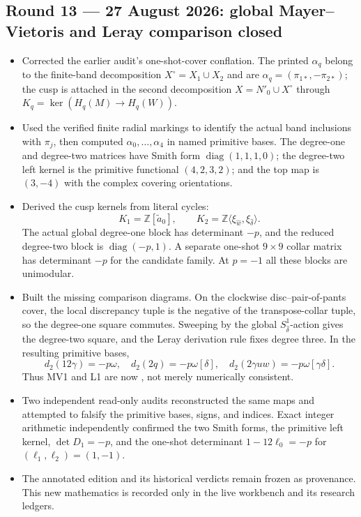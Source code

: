 \subsection*{Round 13 --- 27 August 2026: global Mayer--Vietoris and Leray comparison closed}

\begin{itemize}[leftmargin=1.8em]
\item Corrected the earlier audit's one-shot-cover conflation.  The printed
$\alpha_q$ belong to the finite-band decomposition
$X^\circ=X_1\cup X_2$ and are
$\alpha_q=(\pi_{1*},-\pi_{2*})$; the cusp is attached in the second
decomposition $X=N'_0\cup X^\circ$ through
$K_q=\ker(H_q(M)\to H_q(W))$.
\item Used the verified finite radial markings to identify the actual band
inclusions with $\pi_j$, then computed $\alpha_0,\ldots,\alpha_4$ in named
primitive bases.  The degree-one and degree-two matrices have Smith form
$\operatorname{diag}(1,1,1,0)$; the degree-two left kernel is the primitive
functional $(4,2,3,2)$; and the top map is $(3,-4)$ with the complex
covering orientations.
\item Derived the cusp kernels from literal cycles:
\[
K_1=\mathbb Z[\widetilde a_0],\qquad
K_2=\mathbb Z\langle\xi_{\widehat w},
                         \xi_{\widehat\delta}\rangle.
\]
The actual global degree-one block has determinant $-p$, and the reduced
degree-two block is $\operatorname{diag}(-p,1)$.  A separate one-shot
$9\times9$ collar matrix has determinant $-p$ for the candidate family.
At $p=-1$ all these blocks are unimodular.
\item Built the missing comparison diagrams.  On the clockwise
disc--pair-of-pants cover, the local discrepancy tuple is the negative of the
transpose-collar tuple, so the degree-one square commutes.  Sweeping by the
global $S^1_{\widehat\delta}$-action gives the degree-two square, and the
Leray derivation rule fixes degree three.  In the resulting primitive bases,
\[
d_2(12\gamma)=-p\omega,\quad
d_2(2q)=-p\omega[\delta],\quad
d_2(2\gamma uw)=-p\omega[\gamma\delta].
\]
Thus MV1 and L1 are now \Verified, not merely numerically consistent.
\item Two independent read-only audits reconstructed the same maps and
attempted to falsify the primitive bases, signs, and indices.  Exact integer
arithmetic independently confirmed the two Smith forms, the primitive left
kernel, $\det D_1=-p$, and the one-shot determinant
$1-12\ell_0=-p$ for $(\ell_1,\ell_2)=(1,-1)$.
\item The annotated edition and its historical verdicts remain frozen as
provenance.  This new mathematics is recorded only in the live workbench and
its research ledgers.
\end{itemize}

